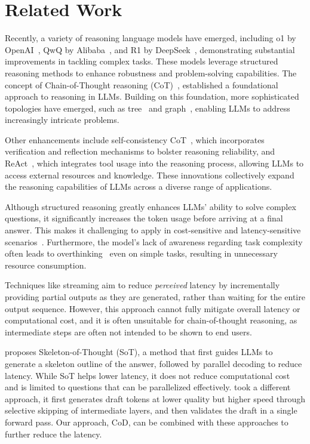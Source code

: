 \section{Related Work}
Recently, a variety of reasoning language models have emerged, including o1 by OpenAI~\cite{o1}, QwQ by Alibaba~\cite{qwq}, and R1 by DeepSeek~\cite{r1}, demonstrating substantial improvements in tackling complex tasks. These models leverage structured reasoning methods to enhance robustness and problem-solving capabilities.
The concept of Chain-of-Thought reasoning (CoT)~\cite{cot, 0shot-cot}, established a foundational approach to reasoning in LLMs. 
Building on this foundation, more sophisticated topologies have emerged, such as tree~\cite{tot, bot, propagation} and graph~\cite{got, got2, resprompt}, enabling LLMs to address increasingly intricate problems.

Other enhancements include self-consistency CoT~\cite{self-consistency}, which incorporates verification and reflection mechanisms to bolster reasoning reliability, and ReAct~\cite{react}, which integrates tool usage into the reasoning process, allowing LLMs to access external resources and knowledge. These innovations collectively expand the reasoning capabilities of LLMs across a diverse range of applications.



Although structured reasoning greatly enhances LLMs' ability to solve complex questions, 
it significantly increases the token usage before arriving at a final answer.
This makes it challenging to apply in cost-sensitive and latency-sensitive scenarios~\cite{token_economy}.
Furthermore, the model’s lack of awareness regarding task complexity often leads to overthinking~\cite{over-thinking, over-reasoning} even on simple tasks, resulting in unnecessary resource consumption.

Techniques like streaming aim to reduce {\em perceived} latency by incrementally providing partial outputs as they are generated, rather than waiting for the entire output sequence. However, this approach cannot fully mitigate overall latency or computational cost, and it is often unsuitable for chain-of-thought reasoning, as intermediate steps are often not intended to be shown to end users.

\citet{skeleton_of_thought} proposes Skeleton-of-Thought (SoT), a method that first guides LLMs to generate a skeleton outline of the answer, followed by parallel decoding to reduce latency. While SoT helps lower latency, it does not reduce computational cost and is limited to questions that can be parallelized effectively. 
\citet{draft_n_verify} took a different approach, it first generates draft tokens at lower quality but higher speed through selective skipping of intermediate layers, and then validates the draft in a single forward pass.
Our approach, CoD, can be combined with these approaches to further reduce the latency. 

